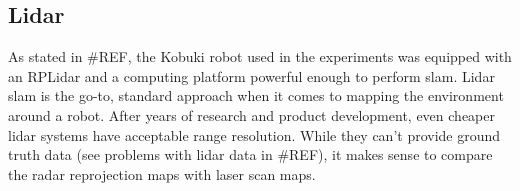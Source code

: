 \subsection{Lidar}\label{lidar-1}

As stated in \#REF, the Kobuki robot used in the experiments was
equipped with an RPLidar and a computing platform powerful enough to
perform slam. Lidar slam is the go-to, standard approach when it comes
to mapping the environment around a robot. After years of research and
product development, even cheaper lidar systems have acceptable range
resolution. While they can't provide ground truth data (see problems
with lidar data in \#REF), it makes sense to compare the radar
reprojection maps with laser scan maps.
